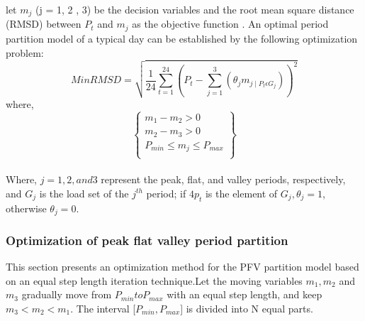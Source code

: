 \documentclass[12pt]{article}
\begin{document}
let $m_{j}$ (j = 1,  2 , 3) be the decision variables and the root mean square distance
(RMSD) between $P_{t}$ and $m_{j}$ as the objective function \cite{witten2002data}. An optimal period
partition model of a typical day can be established by the following optimization
problem:
\begin{equation}
MinRMSD=\sqrt{\frac{1}{24}\sum_{t=1}^{24}(P_{t}-\sum_{j=1}^{3}(\theta_{j}m_{j\mid P_{t} \epsilon G_{j}}))^{2}}
\end{equation}
where, 
\begin{equation}
\left\lbrace
\begin{array}{c}
m_{1}-m_{2}>0 \\ 
m_{2}-m_{3}>0\\ 
P_{min}\leq m_{j} \leq P_{max}\\
\end{array}
\right\rbrace
\end{equation}
\\
Where, $j = 1,2, and 3$ represent the peak, flat, and valley periods, respectively, and $G_{j}$  is the load set of the  $j^{th}$ period; if  $4p_{t}$ is the element  of  $G_{j},\theta_{j} = 1$, otherwise $\theta_{j} = 0 .$
\smallskip
\subsubsection{Optimization of peak flat valley period partition}
This section presents an optimization method for the PFV partition model based
on an equal step length iteration technique.Let the moving variables $m_{1}, m_{2}$ and $m_{3}$ gradually move from  $P_{min} to P_{max} $ with an equal step length, and keep $m_{3}<m_{2}<m_{1}$. The interval [$P_{min},P_{max}$] is divided into N equal parts.\\

\pagebreak
\end{document}
